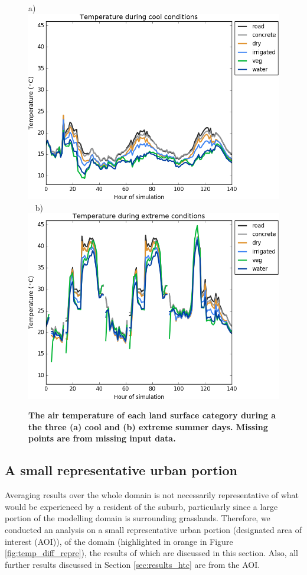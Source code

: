 \documentclass[final,3p,times,authoryear]{elsarticle}
\begin{document}
\begin{figure}[!htbp]
\centering   
a)\includegraphics[scale=0.40]{images/fig1a}
~
b)\includegraphics[scale=0.40]{images/fig1b} 
\caption{\bf The air temperature of each land surface category during a the three (a) cool and (b) extreme summer days. Missing points are from missing input data.}    
 \label{fig:surface_air_temps} 
\end{figure} 


\subsection{A small representative urban portion}\label{sec:result_rep_urban}
Averaging results over the whole domain is not necessarily representative of what would be experienced by a resident of the suburb, particularly since a large portion of the modelling domain is surrounding grasslands. Therefore, we conducted an analysis on a small representative urban portion (designated area of interest (AOI)), of the domain (highlighted in orange in Figure \ref{fig:temp_diff_repre}), the results of which are discussed in this section. Also, all further results discussed in Section \ref{sec:results_htc} are from the AOI.
\end{document}
